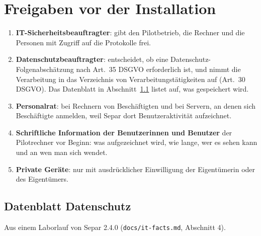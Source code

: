 \documentclass[11pt,a4paper]{article}
\begin{document}
\section{Freigaben vor der Installation}
\label{sec:approvals}

\begin{enumerate}
  \item \textbf{IT-Sicherheitsbeauftragter}: gibt den Pilotbetrieb, die Rechner und die Personen
    mit Zugriff auf die Protokolle frei.
  \item \textbf{Datenschutzbeauftragter}: entscheidet, ob eine Datenschutz-Folgenabschätzung nach
    Art.~35 DSGVO erforderlich ist, und nimmt die Verarbeitung in das Verzeichnis von
    Verarbeitungstätigkeiten auf (Art.~30 DSGVO). Das Datenblatt in Abschnitt~\ref{sec:facts}
    listet auf, was gespeichert wird.
  \item \textbf{Personalrat}: bei Rechnern von Beschäftigten und bei Servern, an denen sich
    Beschäftigte anmelden, weil Separ dort Benutzeraktivität aufzeichnet.
  \item \textbf{Schriftliche Information der Benutzerinnen und Benutzer} der Pilotrechner vor
    Beginn: was aufgezeichnet wird, wie lange, wer es sehen kann und an wen man sich wendet.
  \item \textbf{Private Geräte}: nur mit ausdrücklicher Einwilligung der Eigentümerin oder des
    Eigentümers.
\end{enumerate}

\subsection{Datenblatt Datenschutz}
\label{sec:facts}
Aus einem Laborlauf von Separ 2.4.0 (\texttt{docs/it-facts.md}, Abschnitt 4).
\end{document}
